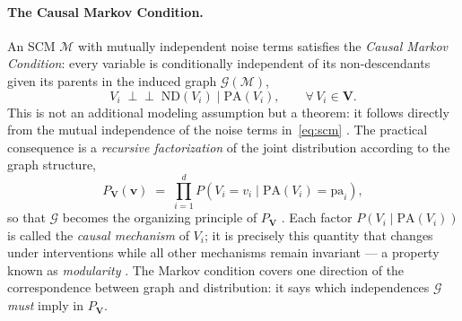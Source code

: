 \paragraph{The Causal Markov Condition.}
An SCM $\mathcal{M}$ with mutually independent noise terms satisfies the \emph{Causal Markov Condition}: every variable is conditionally independent of its non-descendants given its parents in the induced graph $\mathcal{G}(\mathcal{M})$,
\begin{equation}
    V_i \;\perp\!\!\!\perp\; \mathrm{ND}(V_i) \;\Big|\; \mathrm{PA}(V_i),
    \qquad \forall\, V_i \in \mathbf{V}.
    \label{eq:markov-condition}
\end{equation}
This is not an additional modeling assumption but a theorem: it follows directly from the mutual independence of the noise terms in~\eqref{eq:scm} \cite{Peters2017ElementsOC}.
The practical consequence is a \emph{recursive factorization} of the joint distribution according to the graph structure, \begin{equation}
    P_{\mathbf{V}}(\mathbf{v})
    \;=\;
    \prod_{i=1}^{d}
    P\!\left(V_i = v_i \;\Big|\; \mathrm{PA}(V_i) = \mathrm{pa}_i\right),
    \label{eq:factorization}
\end{equation}
so that $\mathcal{G}$ becomes the organizing principle of $P_{\mathbf{V}}$
\cite{Pearl_2009, Spirtes2001CausationPA}.
Each factor $P(V_i \mid \mathrm{PA}(V_i))$ is called the \emph{causal mechanism} of $V_i$; it is precisely this quantity that changes under interventions while all other mechanisms remain invariant --- a property known as \emph{modularity}
\cite{Pearl_2009, Peters2017ElementsOC}.
The Markov condition covers one direction of the correspondence between graph and distribution: it says which independences $\mathcal{G}$ \emph{must} imply in $P_{\mathbf{V}}$.



